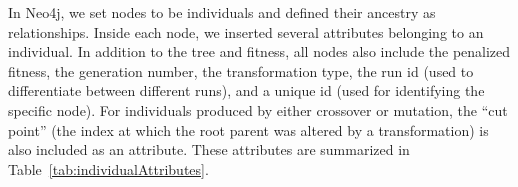 \documentclass[12pt]{article}
\begin{document}
In Neo4j, we set nodes to be individuals and defined their ancestry as relationships. Inside each node, we inserted several attributes belonging to an individual. In addition to the tree and fitness, all nodes also include the penalized fitness, the generation number, the transformation type, the run id (used to differentiate between different runs), and a unique id (used for identifying the specific node). For individuals produced by either crossover or mutation, the ``cut point'' (the index at which the root parent was altered by a transformation) is also included as an attribute. These attributes are summarized in Table~\ref{tab:individualAttributes}.
\begin{table}[tb]
\begin{center}
\caption{Chart summarizing attributes that are recorded for individuals produced by each transformation type.}
\label{tab:individualAttributes}
\end{center}
\end{table}
\end{document}
